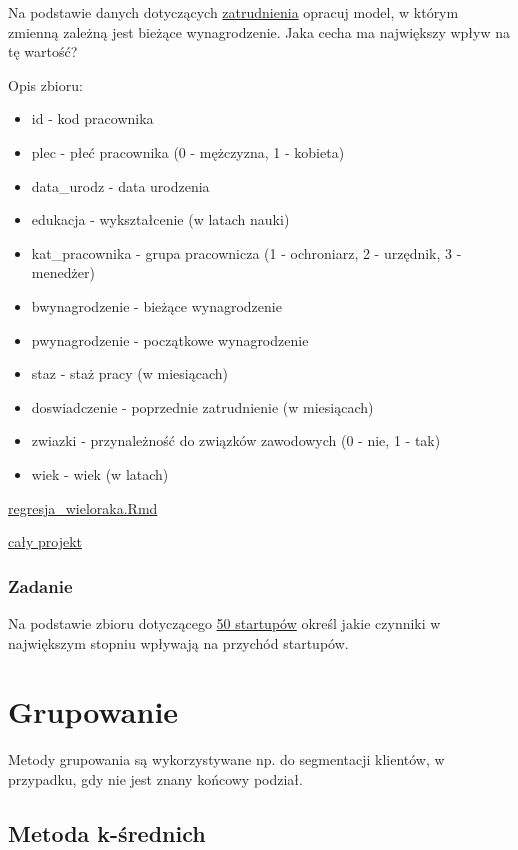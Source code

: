 \documentclass[]{book}
\providecommand{\tightlist}{%
  \setlength{\itemsep}{0pt}\setlength{\parskip}{0pt}}
\begin{document}
Na podstawie danych dotyczących \href{data/pracownicy.csv}{zatrudnienia}
opracuj model, w którym zmienną zależną jest bieżące wynagrodzenie. Jaka
cecha ma największy wpływ na tę wartość?

Opis zbioru:

\begin{itemize}
\tightlist
\item
  id - kod pracownika
\item
  plec - płeć pracownika (0 - mężczyzna, 1 - kobieta)
\item
  data\_urodz - data urodzenia
\item
  edukacja - wykształcenie (w latach nauki)
\item
  kat\_pracownika - grupa pracownicza (1 - ochroniarz, 2 - urzędnik, 3 -
  menedżer)
\item
  bwynagrodzenie - bieżące wynagrodzenie
\item
  pwynagrodzenie - początkowe wynagrodzenie
\item
  staz - staż pracy (w miesiącach)
\item
  doswiadczenie - poprzednie zatrudnienie (w miesiącach)
\item
  zwiazki - przynależność do związków zawodowych (0 - nie, 1 - tak)
\item
  wiek - wiek (w latach)
\end{itemize}

\href{res/regresja_wieloraka.Rmd}{regresja\_wieloraka.Rmd}

\href{res/adr.zip}{cały projekt}

\subsection{Zadanie}\label{zadanie-1}

Na podstawie zbioru dotyczącego \href{data/50_Startups.csv}{50
startupów} określ jakie czynniki w największym stopniu wpływają na
przychód startupów.

\chapter{Grupowanie}\label{grupowanie}

Metody grupowania są wykorzystywane np. do segmentacji klientów, w
przypadku, gdy nie jest znany końcowy podział.

\section{Metoda k-średnich}\label{metoda-k-srednich}
\end{document}

